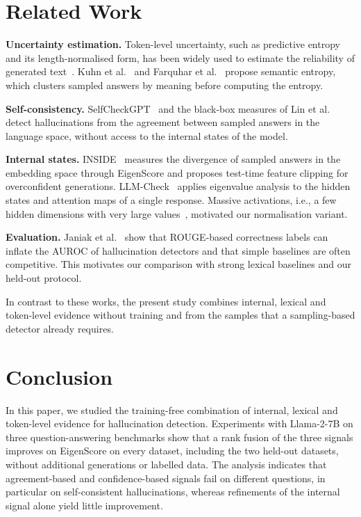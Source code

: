 \documentclass[conference]{IEEEtran}
\begin{document}
\section{Related Work}\label{sec:related}
\textbf{Uncertainty estimation.} Token-level uncertainty, such as predictive entropy and its length-normalised form, has been widely used to estimate the reliability of generated text~\cite{malinin2021}. Kuhn et al.~\cite{kuhn2023} and Farquhar et al.~\cite{farquhar2024} propose semantic entropy, which clusters sampled answers by meaning before computing the entropy.

\textbf{Self-consistency.} SelfCheckGPT~\cite{manakul2023} and the black-box measures of Lin et al.~\cite{lin2023generating} detect hallucinations from the agreement between sampled answers in the language space, without access to the internal states of the model.

\textbf{Internal states.} INSIDE~\cite{chen2024inside} measures the divergence of sampled answers in the embedding space through EigenScore and proposes test-time feature clipping for overconfident generations. LLM-Check~\cite{sriramanan2024} applies eigenvalue analysis to the hidden states and attention maps of a single response. Massive activations, i.e., a few hidden dimensions with very large values~\cite{sun2024massive}, motivated our normalisation variant.

\textbf{Evaluation.} Janiak et al.~\cite{janiak2025} show that ROUGE-based correctness labels can inflate the AUROC of hallucination detectors and that simple baselines are often competitive. This motivates our comparison with strong lexical baselines and our held-out protocol.

In contrast to these works, the present study combines internal, lexical and token-level evidence without training and from the samples that a sampling-based detector already requires.

\section{Conclusion}\label{sec:conclusion}
In this paper, we studied the training-free combination of internal, lexical and token-level evidence for hallucination detection. Experiments with Llama-2-7B on three question-answering benchmarks show that a rank fusion of the three signals improves on EigenScore on every dataset, including the two held-out datasets, without additional generations or labelled data. The analysis indicates that agreement-based and confidence-based signals fail on different questions, in particular on self-consistent hallucinations, whereas refinements of the internal signal alone yield little improvement.
\end{document}
